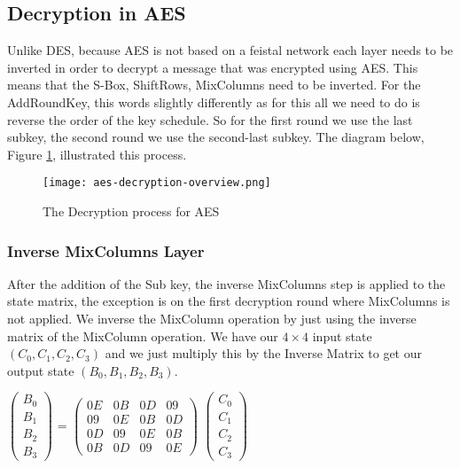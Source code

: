 \subsection{Decryption in AES}

Unlike DES, because AES is not based on a feistal network each layer needs to be inverted in order to decrypt a message that was encrypted using AES. This means that the S-Box, ShiftRows, MixColumns need to be inverted. For the AddRoundKey, this words slightly differently as for this all we need to do is reverse the order of the key schedule. So for the first round we use the last subkey, the second round we use the second-last subkey. The diagram below, Figure \ref{AES-Dec-Overview}, illustrated this process.

\begin{figure}[H]
\begin{center}
\texttt{[image: aes-decryption-overview.png]}
\end{center}
\caption{The Decryption process for AES}
\label{AES-Dec-Overview}
\end{figure}

\subsubsection{Inverse MixColumns Layer}

After the addition of the Sub key, the inverse MixColumns step is applied to the state matrix, the exception is on the first decryption round where MixColumns is not applied. We inverse the MixColumn operation by just using the inverse matrix of the MixColumn operation. We have our $4\times4$ input state $(C_0, C_1, C_2, C_3)$ and we just multiply this by the Inverse Matrix to get our output state $(B_0, B_1, B_2, B_3)$.

\begin{center}
$
\begin{pmatrix}
B_0 \\
B_1 \\
B_2 \\
B_3
\end{pmatrix} 
$
=
$
\begin{pmatrix}
0E & 0B & 0D & 09 \\
09 & 0E & 0B & 0D \\
0D & 09 & 0E & 0B \\
0B & 0D & 09 & 0E
\end{pmatrix}
$
$
\begin{pmatrix}
C_0 \\
C_1 \\
C_2 \\
C_3 
\end{pmatrix}
$
\end{center}

